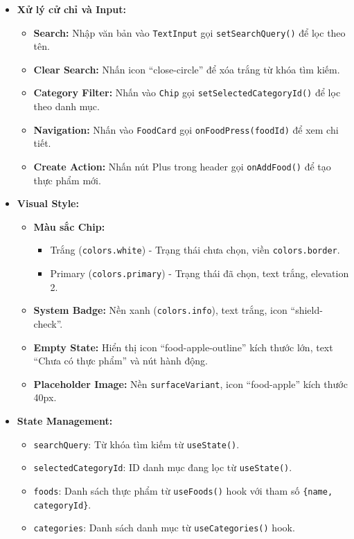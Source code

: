 \begin{itemize}
\begin{itemize}
        \end{itemize}
    \item \textbf{Xử lý cử chỉ và Input:}
        \begin{itemize}
            \item \textbf{Search:} Nhập văn bản vào \texttt{TextInput} gọi \texttt{setSearchQuery()} để lọc theo tên.
            \item \textbf{Clear Search:} Nhấn icon ``close-circle'' để xóa trắng từ khóa tìm kiếm.
            \item \textbf{Category Filter:} Nhấn vào \texttt{Chip} gọi \texttt{setSelectedCategoryId()} để lọc theo danh mục.
            \item \textbf{Navigation:} Nhấn vào \texttt{FoodCard} gọi \texttt{onFoodPress(foodId)} để xem chi tiết.
            \item \textbf{Create Action:} Nhấn nút Plus trong header gọi \texttt{onAddFood()} để tạo thực phẩm mới.
        \end{itemize}
    \item \textbf{Visual Style:}
        \begin{itemize}
            \item \textbf{Màu sắc Chip:}
                \begin{itemize}
                    \item Trắng (\texttt{colors.white}) - Trạng thái chưa chọn, viền \texttt{colors.border}.
                    \item Primary (\texttt{colors.primary}) - Trạng thái đã chọn, text trắng, elevation 2.
                \end{itemize}
            \item \textbf{System Badge:} Nền xanh (\texttt{colors.info}), text trắng, icon ``shield-check''.
            \item \textbf{Empty State:} Hiển thị icon ``food-apple-outline'' kích thước lớn, text ``Chưa có thực phẩm'' và nút hành động.
            \item \textbf{Placeholder Image:} Nền \texttt{surfaceVariant}, icon ``food-apple'' kích thước 40px.
        \end{itemize}
    \item \textbf{State Management:}
        \begin{itemize}
            \item \texttt{searchQuery}: Từ khóa tìm kiếm từ \texttt{useState()}.
            \item \texttt{selectedCategoryId}: ID danh mục đang lọc từ \texttt{useState()}.
            \item \texttt{foods}: Danh sách thực phẩm từ \texttt{useFoods()} hook với tham số \texttt{\{name, categoryId\}}.
            \item \texttt{categories}: Danh sách danh mục từ \texttt{useCategories()} hook.
        \end{itemize}
\end{itemize}



